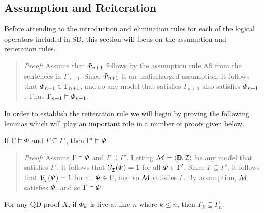 \subsection{Assumption and Reiteration}%
  \label{sub:AssumptionRule}

Before attending to the introduction and elimination rules for each of the logical operators included in SD, this section will focus on the assumption and reiteration rules.

\label{rule:AS}

\begin{quote} 
  \textit{Proof:} Assume that $\varPhi_{n+1}$ follows by the assumption rule AS from the sentences in $\Gamma_{n+1}$.
  Since $\varPhi_{n+1}$ is an undischarged assumption, it follows that $\varPhi_{n+1}\in\Gamma_{n+1}$, and so any model that satisfies $\Gamma_{n+1}$ also satisfies $\varPhi_{n+1}$. 
  Thus $\Gamma_{n+1} \vDash \varPhi_{n+1}$.
\end{quote}

In order to establish the reiteration rule we will begin by proving the following lemmas which will play an important role in a number of proofs given below.

\begin{Lthm} \label{lemma:weak}
  If $\Gamma \vDash \varPhi$ and $\Gamma \subseteq \Gamma'$, then $\Gamma' \vDash \varPhi$.
\end{Lthm}

\begin{quote} 
  \textit{Proof:} Assume $\Gamma \vDash \varPhi$ and $\Gamma \supseteq \Gamma'$.
  Letting $\mathcal{M}=\langle\mathbb{D},\mathcal{I}\rangle$ be any model that satisfies $\Gamma'$, it follows that $\mathcal{V}_{\mathcal{I}}^{}(\varPsi)=1$ for all $\varPsi \in \Gamma'$.
  Since $\Gamma\subseteq \Gamma'$, it follows that $\mathcal{V}_{\mathcal{I}}^{}(\varPsi)=1$ for all $\varPsi \in \Gamma$, and so $\mathcal{M}$ satisfies $\Gamma$. 
  By assumption, $\mathcal{M}$ satisfies $\varPhi$, and so $\Gamma \vDash \varPhi$.
\end{quote}



\begin{Lthm} \label{lemma:live}
  For any QD proof $X$, if $\varPhi_k$ is live at line $n$ where $k\leq n$, then $\Gamma_k\subseteq \Gamma_{n}$.
\end{Lthm}


